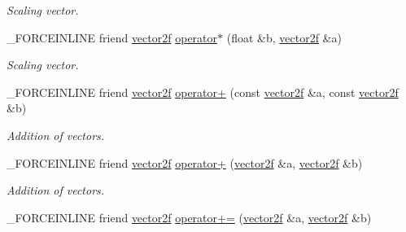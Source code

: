 \begin{DoxyCompactItemize}
\begin{DoxyCompactList}\small\item\em Scaling vector. \end{DoxyCompactList}\item 
\hypertarget{classbt_1_1vector2f_a3d8d4dcd3f25e80007c69fc2d5dc7a7b}{\-\_\-\-F\-O\-R\-C\-E\-I\-N\-L\-I\-N\-E friend \hyperlink{classbt_1_1vector2f}{vector2f} \hyperlink{classbt_1_1vector2f_a3d8d4dcd3f25e80007c69fc2d5dc7a7b}{operator$\ast$} (float \&b, \hyperlink{classbt_1_1vector2f}{vector2f} \&a)}\label{classbt_1_1vector2f_a3d8d4dcd3f25e80007c69fc2d5dc7a7b}

\begin{DoxyCompactList}\small\item\em Scaling vector. \end{DoxyCompactList}\item 
\hypertarget{classbt_1_1vector2f_a61ab2fc916008dd2fd788c041a1159ed}{\-\_\-\-F\-O\-R\-C\-E\-I\-N\-L\-I\-N\-E friend \hyperlink{classbt_1_1vector2f}{vector2f} \hyperlink{classbt_1_1vector2f_a61ab2fc916008dd2fd788c041a1159ed}{operator+} (const \hyperlink{classbt_1_1vector2f}{vector2f} \&a, const \hyperlink{classbt_1_1vector2f}{vector2f} \&b)}\label{classbt_1_1vector2f_a61ab2fc916008dd2fd788c041a1159ed}

\begin{DoxyCompactList}\small\item\em Addition of vectors. \end{DoxyCompactList}\item 
\hypertarget{classbt_1_1vector2f_a395e0ad406fa323669a135cfb23f9c44}{\-\_\-\-F\-O\-R\-C\-E\-I\-N\-L\-I\-N\-E friend \hyperlink{classbt_1_1vector2f}{vector2f} \hyperlink{classbt_1_1vector2f_a395e0ad406fa323669a135cfb23f9c44}{operator+} (\hyperlink{classbt_1_1vector2f}{vector2f} \&a, \hyperlink{classbt_1_1vector2f}{vector2f} \&b)}\label{classbt_1_1vector2f_a395e0ad406fa323669a135cfb23f9c44}

\begin{DoxyCompactList}\small\item\em Addition of vectors. \end{DoxyCompactList}\item 
\hypertarget{classbt_1_1vector2f_a218fe437129581bf36d181481c930bc2}{\-\_\-\-F\-O\-R\-C\-E\-I\-N\-L\-I\-N\-E friend \hyperlink{classbt_1_1vector2f}{vector2f} \hyperlink{classbt_1_1vector2f_a218fe437129581bf36d181481c930bc2}{operator+=} (\hyperlink{classbt_1_1vector2f}{vector2f} \&a, \hyperlink{classbt_1_1vector2f}{vector2f} \&b)}\label{classbt_1_1vector2f_a218fe437129581bf36d181481c930bc2}


\end{DoxyCompactItemize}
